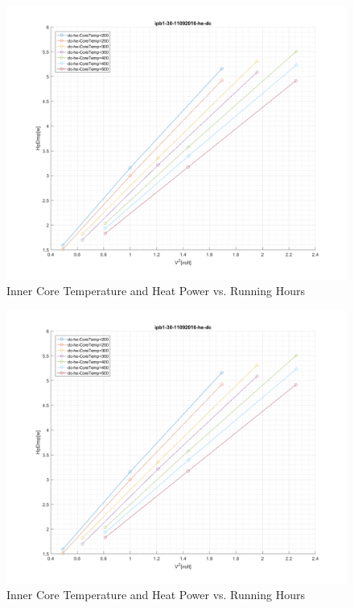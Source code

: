 \documentclass{article}%
\begin{document}
\begin{figure}
[h]
\begin{center}
\includegraphics[scale=0.4]{ipb1-30-11092016-he-dc-HpD-V2.png} 
\caption{Inner Core Temperature and Heat Power vs. Running Hours}%
\end{center}
\end{figure}
\begin{figure}
[h]
\begin{center}
\includegraphics[scale=0.4]{ipb1-30-11092016-he-dc-HpD-V2.png} 
\caption{Inner Core Temperature and Heat Power vs. Running Hours}%
\end{center}
\end{figure}
\end{document}
